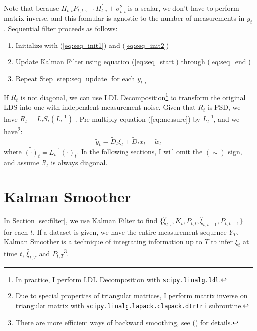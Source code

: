 \documentclass[12pt]{article}
\newenvironment{boenumerate}
    {\begin{enumerate}\renewcommand\labelenumi{\textbf\theenumi}}
    {\end{enumerate}}
\numberwithin{equation}{section}
\begin{document}
Note that because $H_{t:i}P_{t,t:i-1}H_{t:i}^{'}+\sigma_{t:i}^{2}$ is a scalar, we don't have to perform matrix inverse, and this formular is agnostic to the number of measurements in $y_t$. Sequential filter proceeds as follows:
\begin{boenumerate}
    \item Initialize with (\ref{eq:seq_init1}) and (\ref{eq:seq_init2})
    \item \label{step:seq_update} Update Kalman Filter using equation (\ref{eq:seq_start}) through (\ref{eq:seq_end})
    \item Repeat Step \ref{step:seq_update} for each $y_{t:i}$
\end{boenumerate}
If $R_t$ is not diagonal, we can use LDL Decomposition\footnote{In practice, I perform LDL Decomposition with \texttt{scipy.linalg.ldl}.} to transform the original LDS into one with independent measurement noise. Given that $R_t$ is PSD, we have $R_t = L_tS_t(L_t^{-1})^{'}$. Pre-multiply equation (\ref{eq:measure}) by $L_t^{-1}$, and we have\footnote{Due to special properties of triangular matrices, I perform matrix inverse on triangular matrix with \texttt{scipy.linalg.lapack.clapack.dtrtri} subroutine.}:
\[
    \tilde{y}_t = \tilde{D}_t\xi_{t} + \tilde{D}_{t}x_t + \tilde{w}_t
\]
where $\tilde{(\cdot)}_t = L_t^{-1}(\cdot)_t$. In the following sections, I will omit the $(\sim)$ sign, and assume $R_t$ is always diagonal. 

\section{Kalman Smoother} \label{sec:smoother}
In Section \ref{sec:filter}, we use Kalman Filter to find $\{\hat{\xi}_{t,t}, K_t, P_{t,t}, \hat{\xi}_{t,t-1}, P_{t,t-1}\}$ for each $t$. If a dataset is given, we have the entire measurement sequence $Y_T$. Kalman Smoother is a technique of integrating information up to $T$ to infer $\xi_t$ at time $t$, $\hat{\xi}_{t,T}$ and $P_{t,T}$\footnote{There are more efficient ways of backward smoothing, see (\cite{koopman_1993}) for details.}. 
\end{document}
